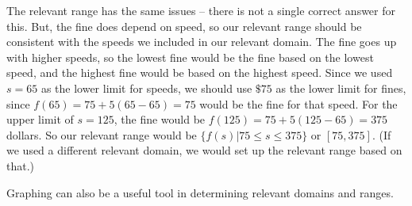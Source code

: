 {\begin{enumerate}[label=(\alph*)]
		The relevant range has the same issues – there is not a single correct answer for this. But, the fine does depend on speed, so our relevant range should be consistent with the speeds we included in our relevant domain. The fine goes up with higher speeds, so the lowest fine would be the fine based on the lowest speed, and the highest fine would be based on the highest speed.  Since we used $s=65$ as the lower limit for speeds, we should use $\$75$ as the lower limit for fines, since $f(65)=75+5(65-65)=75$ would be the fine for that speed.  For the upper limit of $s=125$, the fine would be $f(125)=75+5(125-65)=375$ dollars. So our relevant range would be $\{f(s)|75 \leq s \leq 375\}$ or $[75,375]$. (If we used a different relevant domain, we would set up the relevant range based on that.)
	\end{enumerate} 
}

Graphing can also be a useful tool in determining relevant domains and ranges.


